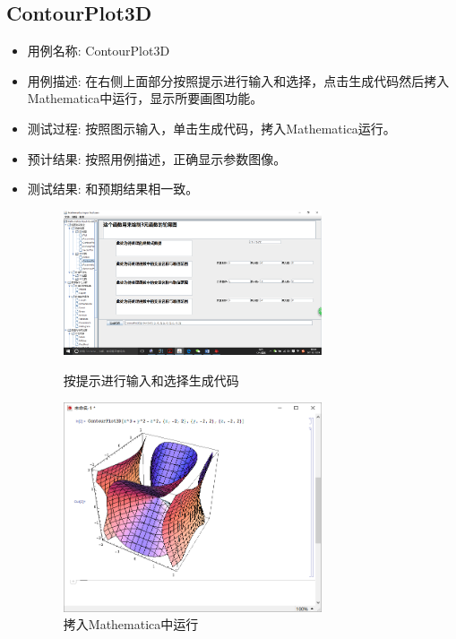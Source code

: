 \documentclass[hyperref, UTF8
,bookmarksnumbered=true, oneside]{ctexbook}
\begin{document}
		
		\subsection{ContourPlot3D} %
		\begin{itemize}
			\item 用例名称: ContourPlot3D
			\item 用例描述: 在右侧上面部分按照提示进行输入和选择，点击生成代码然后拷入Mathematica中运行，显示所要画图功能。
			\item 测试过程: 按照图示输入，单击生成代码，拷入Mathematica运行。
			\item 预计结果: 按照用例描述，正确显示参数图像。
			\item 测试结果:	和预期结果相一致。

				\begin{figure}[!h]
	                \begin{minipage}[b]{0.45\textwidth}
	                \centering
	                \includegraphics[width=3in]{8.png}
	                \caption{按提示进行输入和选择生成代码}
	                \label{pic:MathPack}
	                \end{minipage}%
	                \hspace{0.1\textwidth}%
	                \begin{minipage}[b]{0.45\textwidth}
	                \centering
	                \includegraphics[width=3in]{9.png}
	                \caption{拷入Mathematica中运行}
	                \label{pic:GUIPack}
	                \end{minipage}
            	\end{figure}

		\end{itemize}
		
\end{document}
